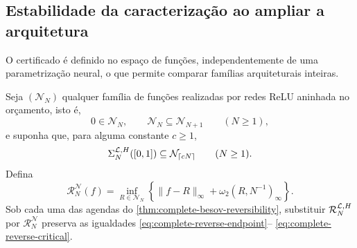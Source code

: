 \subsection{Estabilidade da caracterização ao ampliar a arquitetura}

O certificado é definido no espaço de funções, independentemente de uma
parametrização neural, o que permite comparar famílias arquiteturais inteiras.

\begin{theorem}
\label{thm:architecture-stable-reversibility}
Seja $(\mathcal N_N)$ qualquer família de funções realizadas por redes ReLU
aninhada no orçamento, isto é,
\begin{equation}
 0\in\mathcal N_N,
 \qquad \mathcal N_N\subseteq\mathcal N_{N+1}
 \qquad(N\ge1),
 \label{eq:network-family-nesting}
\end{equation}
e suponha que, para alguma constante $c\ge1$,
\begin{equation}
 \Sigma_N^{\mathcal{L},H}([0,1])\subseteq\mathcal N_{\lceil cN\rceil}
 \qquad(N\ge1).
 \label{eq:network-family-contains-library}
\end{equation}
Defina
\begin{equation}
 \mathcal R_N^{\mathcal N}(f)
 =\inf_{R\in\mathcal N_N}
 \left\{\|f-R\|_\infty+\omega_2(R,N^{-1})_\infty\right\}.
 \label{eq:network-regularized-certificate}
\end{equation}
Sob cada uma das agendas do
\cref{thm:complete-besov-reversibility}, substituir
$\mathcal R_N^{\mathcal{L},H}$ por $\mathcal R_N^{\mathcal N}$ preserva as
igualdades \eqref{eq:complete-reverse-endpoint}--
\eqref{eq:complete-reverse-critical}.
\end{theorem}

